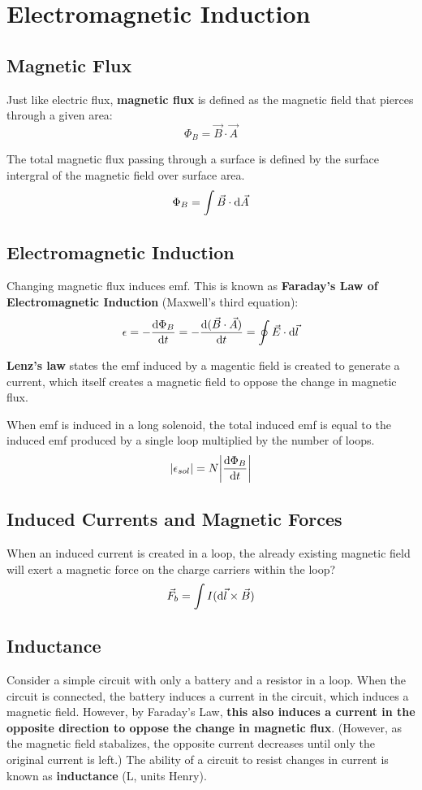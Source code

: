 \documentclass{article}
\begin{document}
\newpage

\section{Electromagnetic Induction}
\subsection{Magnetic Flux}
Just like electric flux, \textbf{magnetic flux} is defined as the magnetic field that pierces through a given area:
\[\Phi_{B} = \vec{B} \cdot \vec{A}\]

The total magnetic flux passing through a surface is defined by the surface intergral of the magnetic field over surface area.
\[\Phi_{B} = \int \vec{B} \cdot \odif{\vec{A}}\]

\subsection{Electromagnetic Induction}
Changing magnetic flux induces emf. This is known as \textbf{Faraday's Law of Electromagnetic Induction} (Maxwell's third equation):
\[\epsilon = -\odv{\Phi_{B}}{t} = -\odv{(\vec{B} \cdot \vec{A})}{t} = \oint \vec{E} \cdot \odif{\vec{l}}\]

\textbf{Lenz's law} states the emf induced by a magentic field is created to generate a current, which itself creates a magnetic field to oppose the change in magnetic flux.

When emf is induced in a long solenoid, the total induced emf is equal to the induced emf produced by a single loop multiplied by the number of loops.
\[|\epsilon_{sol}| = N \bigg|\odv{\Phi_B}{t}\bigg|\]

\subsection{Induced Currents and Magnetic Forces}
When an induced current is created in a loop, the already existing magnetic field will exert a magnetic force on the charge carriers within the loop?
\[\vec{F}_b = \int I (\odif{\vec{l}} \times \vec{B})\]

\subsection{Inductance}
Consider a simple circuit with only a battery and a resistor in a loop.
When the circuit is connected, the battery induces a current in the circuit, which induces a magnetic field.
However, by Faraday's Law, \textbf{this also induces a current in the opposite direction to oppose the change in magnetic flux}. (However, as the magnetic field stabalizes, the opposite current decreases until only the original current is left.)
The ability of a circuit to resist changes in current is known as \textbf{inductance} (L, units Henry).
\end{document}

